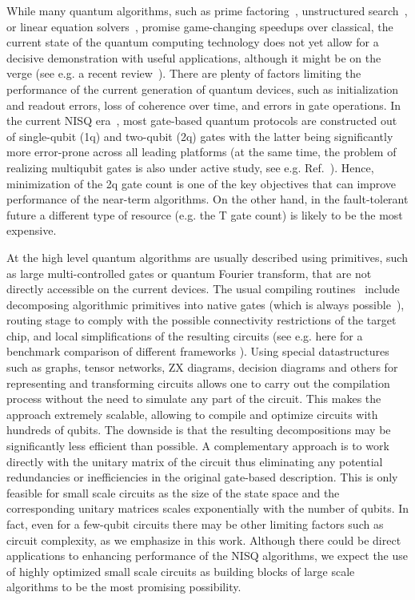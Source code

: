 \documentclass[draft, twocolumn, amsfonts, amssymb, aps, nofootinbib]{revtex4-2}
\newcommand{\T}{\textsf{T }}
\begin{document}
While many quantum algorithms, such as prime factoring~\cite{Shor1997}, unstructured search~\cite{Grover1997}, or linear equation solvers~\cite{Harrow2009}, promise game-changing speedups over classical, the current state of the quantum computing technology does not yet allow for a decisive demonstration with useful applications, although it might be on the verge (see e.g. a recent review~\cite{Fedorov2022}). There are plenty of factors limiting the performance of the current generation of quantum devices, such as initialization and readout errors, loss of coherence over time, and errors in gate operations. In the current NISQ era~\cite{Preskill2018}, most gate-based quantum protocols are constructed out of single-qubit (1q) and two-qubit (2q) gates with the latter being significantly more error-prone across all leading platforms (at the same time, the problem of realizing multiqubit gates is also under active study, see e.g. Ref.~\cite{Khazali2020}). Hence, minimization of the 2q gate count is one of the key objectives that can improve performance of the near-term algorithms. On the other hand, in the fault-tolerant future a different type of resource (e.g. the \T gate count) is likely to be the most expensive.

At the high level quantum algorithms are usually described using primitives, such as large multi-controlled gates or quantum Fourier transform, that are not directly accessible on the current devices. The usual compiling routines~\cite{Qiskit, Sivarajah2021} include decomposing algorithmic primitives into native gates (which is always possible~\cite{Barenco1995}), routing stage to comply with the possible connectivity restrictions of the target chip, and local simplifications of the resulting circuits (see e.g. here for a benchmark comparison of different frameworks \cite{Kharkov2022}). Using special datastructures such as graphs, tensor networks, ZX diagrams, decision diagrams and others for representing and transforming circuits allows one to carry out the compilation process without the need to simulate any part of the circuit. This makes the approach extremely scalable, allowing to compile and optimize circuits with hundreds of qubits. The downside is that the resulting decompositions may be significantly less efficient than possible. A complementary approach is to work directly with the unitary matrix of the circuit thus eliminating any potential redundancies or inefficiencies in the original gate-based description. This is only feasible for small scale circuits as the size of the state space and the corresponding unitary matrices scales exponentially with the number of qubits. In fact, even for a few-qubit circuits there may be other limiting factors such as circuit complexity, as we emphasize in this work. Although there could be direct applications to enhancing performance of the NISQ algorithms, we expect the use of highly optimized small scale circuits as building blocks of large scale algorithms to be the most promising possibility.
\end{document}
